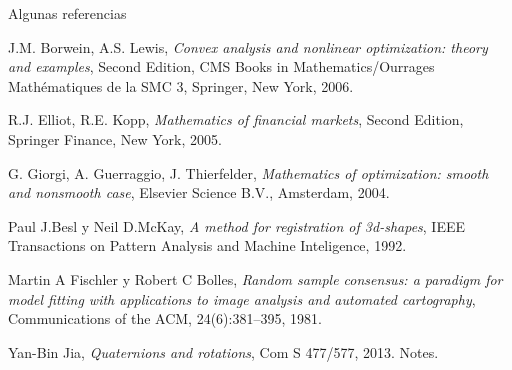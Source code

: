 \documentclass[9pt]{beamer}
\begin{document}
	\begin{frame}{Algunas referencias}
		\justifying
		\begin{thebibliography}{X}
			 J.M. Borwein, A.S. Lewis, \textsl{Convex analysis and nonlinear optimization: theory and examples}, Second Edition, CMS Books in Mathematics/Ourrages Mathématiques de la SMC 3, Springer, New York, 2006.
			
			 R.J. Elliot, R.E. Kopp, \textsl{Mathematics of financial markets}, Second Edition, Springer Finance, New York, 2005.
			
			 G. Giorgi, A. Guerraggio, J. Thierfelder, \textsl{Mathematics of optimization: smooth and nonsmooth case}, Elsevier Science B.V., Amsterdam, 2004.
			
			 Paul J.Besl y Neil D.McKay, \textsl{A method for registration of 3d-shapes}, IEEE Transactions on Pattern Analysis and Machine Inteligence, 1992.
			
			 Martin A Fischler y Robert C Bolles, \textsl{Random sample consensus: a paradigm for model fitting with applications to image analysis and automated cartography}, Communications of the ACM, 24(6):381–395, 1981.
			
			 Yan-Bin Jia, \textsl{Quaternions and rotations}, Com S 477/577, 2013.
			Notes.
		
		\end{thebibliography}
	\end{frame}
	
\end{document}
